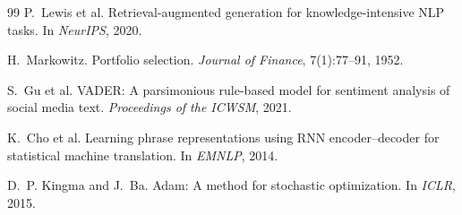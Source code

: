 \documentclass[12pt,a4paper,oneside]{report}
\begin{document}
\begin{thebibliography}{99}
P.~Lewis et al.
\newblock Retrieval-augmented generation for knowledge-intensive NLP
  tasks.
\newblock In \emph{NeurIPS}, 2020.

H.~Markowitz.
\newblock Portfolio selection.
\newblock \emph{Journal of Finance}, 7(1):77--91, 1952.

S.~Gu et al.
\newblock VADER: A parsimonious rule-based model for sentiment
  analysis of social media text.
\newblock \emph{Proceedings of the ICWSM}, 2021.

K.~Cho et al.
\newblock Learning phrase representations using RNN encoder--decoder
  for statistical machine translation.
\newblock In \emph{EMNLP}, 2014.

D.~P. Kingma and J.~Ba.
\newblock Adam: A method for stochastic optimization.
\newblock In \emph{ICLR}, 2015.

\end{thebibliography}
\end{document}
